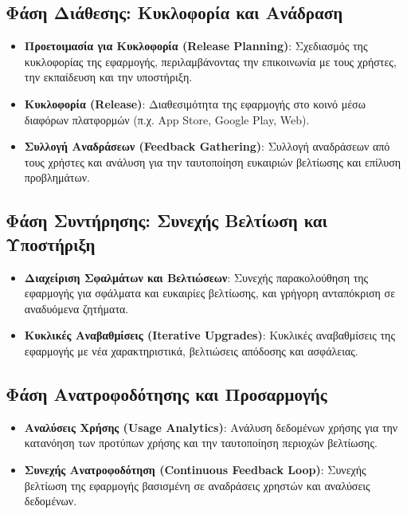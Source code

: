 \documentclass{article}
\begin{document}
\subsection{Φάση Διάθεσης: Κυκλοφορία και Ανάδραση}
\begin{itemize}
    \item \textbf{Προετοιμασία για Κυκλοφορία (Release Planning)}: Σχεδιασμός της κυκλοφορίας της εφαρμογής, περιλαμβάνοντας την επικοινωνία με τους χρήστες, την εκπαίδευση και την υποστήριξη.
    \item \textbf{Κυκλοφορία (Release)}: Διαθεσιμότητα της εφαρμογής στο κοινό μέσω διαφόρων πλατφορμών (π.χ. App Store, Google Play, Web).
    \item \textbf{Συλλογή Αναδράσεων (Feedback Gathering)}: Συλλογή αναδράσεων από τους χρήστες και ανάλυση για την ταυτοποίηση ευκαιριών βελτίωσης και επίλυση προβλημάτων.
\end{itemize}

\subsection{Φάση Συντήρησης: Συνεχής Βελτίωση και Υποστήριξη}
\begin{itemize}
    \item \textbf{Διαχείριση Σφαλμάτων και Βελτιώσεων}: Συνεχής παρακολούθηση της εφαρμογής για σφάλματα και ευκαιρίες βελτίωσης, και γρήγορη ανταπόκριση σε αναδυόμενα ζητήματα.
    \item \textbf{Κυκλικές Αναβαθμίσεις (Iterative Upgrades)}: Κυκλικές αναβαθμίσεις της εφαρμογής με νέα χαρακτηριστικά, βελτιώσεις απόδοσης και ασφάλειας.
\end{itemize}

\subsection{Φάση Ανατροφοδότησης και Προσαρμογής}
\begin{itemize}
    \item \textbf{Αναλύσεις Χρήσης (Usage Analytics)}: Ανάλυση δεδομένων χρήσης για την κατανόηση των προτύπων χρήσης και την ταυτοποίηση περιοχών βελτίωσης.
    \item \textbf{Συνεχής Ανατροφοδότηση (Continuous Feedback Loop)}: Συνεχής βελτίωση της εφαρμογής βασισμένη σε αναδράσεις χρηστών και αναλύσεις δεδομένων.
\end{itemize}
\end{document}
